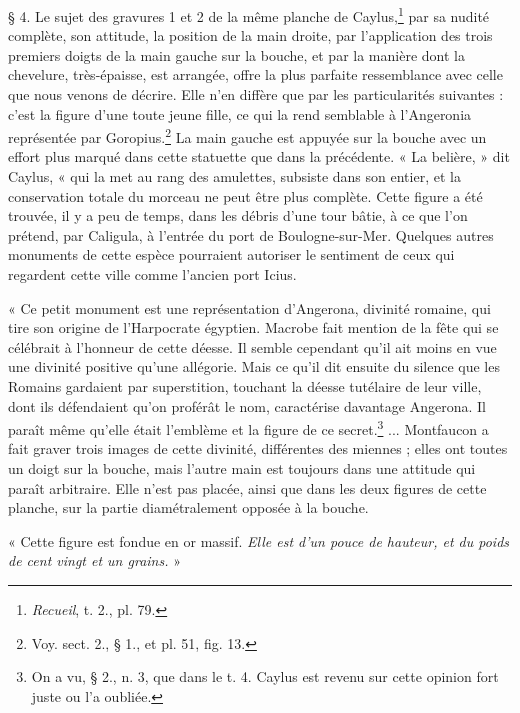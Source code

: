 \documentclass[a4paper, 11pt, oneside, polutonikogreek, french]{article}
\begin{document}
§ 4. Le sujet des gravures 1 et 2 de la même planche de Caylus,\footnote{\emph{Recueil}, t. 2., pl. 79.} par sa nudité complète, son attitude, la position de la main droite, par l'application des trois premiers doigts de la main gauche sur la bouche, et par la manière dont la chevelure, très-épaisse, est arrangée, offre la plus parfaite ressemblance avec celle que nous venons de décrire. Elle n'en diffère que par les particularités suivantes : c'est la figure d'une toute jeune fille, ce qui la rend semblable à l'Angeronia représentée par Goropius.\footnote{Voy. sect. 2., § 1., et pl. 51, fig. 13.} La main gauche est appuyée sur la bouche avec un effort plus marqué dans cette statuette que dans la précédente. « La belière, » dit Caylus, « qui la met au rang des amulettes, subsiste dans son entier, et la conservation totale du morceau ne peut être plus complète. Cette figure a été trouvée, il y a peu de temps, dans les débris d'une tour bâtie, à ce que l'on prétend, par Caligula, à l'entrée du port de Boulogne-sur-Mer. Quelques autres monuments de cette espèce pourraient autoriser le sentiment de ceux qui regardent cette ville comme l'ancien port Icius.

« Ce petit monument est une représentation d'Angerona, divinité romaine, qui tire son origine de l'Harpocrate égyptien. Macrobe fait mention de la fête qui se célébrait à l'honneur de cette déesse. Il semble cependant qu'il ait moins en vue une divinité positive qu'une allégorie. Mais ce qu'il dit ensuite du silence que les Romains gardaient par superstition, touchant la déesse tutélaire de leur ville, dont ils défendaient qu'on proférât le nom, caractérise davantage Angerona. Il paraît même qu'elle était l'emblème et la figure de ce secret.\footnote{On a vu, § 2., n. 3, que dans le t. 4. Caylus est revenu sur cette opinion fort juste ou l'a oubliée.} ... Montfaucon a fait graver trois images de cette divinité, différentes des miennes ; elles ont toutes un doigt sur la bouche, mais l'autre main est toujours dans une attitude qui paraît arbitraire. Elle n'est pas placée, ainsi que dans les deux figures de cette planche, sur la partie diamétralement opposée à la bouche.

« Cette figure est fondue en or massif. \emph{Elle est d'un pouce de hauteur, et du poids de cent vingt et un grains.} » 
\end{document}
